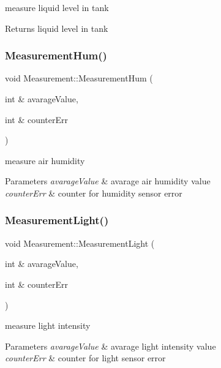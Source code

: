 measure liquid level in tank 

\begin{DoxyReturn}{Returns}
liquid level in tank 
\end{DoxyReturn}
\mbox{\label{class_measurement_aeaa3e7b16fc4b23d4cbe5912205dc68e}} 
\subsubsection{\texorpdfstring{Measurement\+Hum()}{MeasurementHum()}}
{\footnotesize\ttfamily void Measurement\+::\+Measurement\+Hum (\begin{DoxyParamCaption}\item[{int \&}]{avarage\+Value,  }\item[{int \&}]{counter\+Err }\end{DoxyParamCaption})}



measure air humidity 


\begin{DoxyParams}{Parameters}
{\em avarage\+Value} & avarage air humidity value \\
\hline
{\em counter\+Err} & counter for humidity sensor error \\
\hline
\end{DoxyParams}
\mbox{\label{class_measurement_aaf28bd2d4803cb8f4dd06eb84bf0294a}} 
\subsubsection{\texorpdfstring{Measurement\+Light()}{MeasurementLight()}}
{\footnotesize\ttfamily void Measurement\+::\+Measurement\+Light (\begin{DoxyParamCaption}\item[{int \&}]{avarage\+Value,  }\item[{int \&}]{counter\+Err }\end{DoxyParamCaption})}



measure light intensity 


\begin{DoxyParams}{Parameters}
{\em avarage\+Value} & avarage light intensity value \\
\hline
{\em counter\+Err} & counter for light sensor error \\
\hline
\end{DoxyParams}
\mbox{\label{class_measurement_aa53d67259769708cb8ee73cb3c81b8a3}} 
